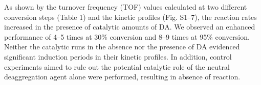 \documentclass[journal=jacsat,manuscript=article]{achemso}
\begin{document}
	
	As shown by the turnover frequency (TOF) values calculated at two different conversion steps (Table 1) and the kinetic profiles (Fig. S1–7), the reaction rates increased in the presence of catalytic amounts of DA. We observed an enhanced performance	of 4–5 times at 30\% conversion and 8–9 times at 95\% conversion. Neither the catalytic runs in the absence nor the	presence of DA evidenced significant induction periods in their kinetic profiles. In addition, control experiments aimed
	to rule out the potential catalytic role of the neutral deaggregation agent alone were performed, resulting in absence of
	reaction.
	
	
	
\end{document}
